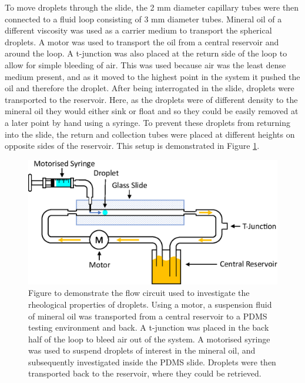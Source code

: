\documentclass{physics_article_B}
\begin{document}
        To move droplets through the slide, the 2 mm diameter capillary tubes were then connected to a fluid loop consisting of 3 mm diameter tubes. Mineral oil of a different viscosity was used as a carrier medium to transport the spherical droplets. A motor was used to transport the oil from a central reservoir and around the loop. A t-junction was also placed at the return side of the loop to allow for simple bleeding of air. This was used because air was the least dense medium present, and as it moved to the highest point in the system it pushed the oil and therefore the droplet. After being interrogated in the slide, droplets were transported to the reservoir. Here, as the droplets were of different density to the mineral oil they would either sink or float and so they could be easily removed at a later point by hand using a syringe. To prevent these droplets from returning into the slide, the return and collection tubes were placed at different heights on opposite sides of the reservoir. This setup is demonstrated in Figure \ref{fig:basic}.
        
            \begin{figure}[H]
                \centering
                    \hspace*{2.0cm}\includegraphics[scale=0.8]{Figures/Fluid.eps}
                    \caption{Figure to demonstrate the flow circuit used to investigate the rheological properties of droplets. Using a motor, a suspension fluid of mineral oil was transported from a central reservoir to a PDMS testing environment and back. A t-junction was placed in the back half of the loop to bleed air out of the system. A motorised syringe was used to suspend droplets of interest in the mineral oil, and subsequently investigated inside the PDMS slide. Droplets were then transported back to the reservoir, where they could be retrieved.} 	
                \label{fig:basic}
            \end{figure} 
\end{document}
